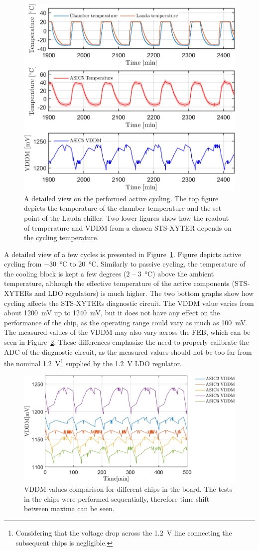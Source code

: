 \begin{figure}[!h]
\centering
\includegraphics[width=0.65\columnwidth]{Chapter4/images/FEB0ASIC5COMP.png}
\caption{A detailed view on the performed active cycling. The top figure depicts the temperature of the chamber temperature and the set point of the Lauda chiller. Two lower figures show how the readout of temperature and VDDM from a chosen STS-XYTER depends on the cycling temperature. }
\label{fig_active_detailed}
\end{figure}
A detailed view of a few cycles is presented in Figure~\ref{fig_active_detailed}. Figure depicts active cycling from \SI{-30}{\celsius} to \SI{20}{\celsius}. Similarly to passive cycling, the temperature of the cooling block is kept a few degrees ($2$ -- \SI{3}{\celsius}) above the ambient temperature, although the effective temperature of the active components (STS-XYTERs and \gls{LDO} regulators) is much higher. The two bottom graphs show how cycling affects the STS-XYTERs diagnostic circuit. The VDDM value varies from about \SI{1200}{\milli\volt} up to \SI{1240}{\milli\volt}, but it does not have any effect on the performance of the chip, as the operating range could vary as much as \SI{100}{\milli\volt}. The measured values of the VDDM may also vary across the \gls{FEB}, which can be seen in Figure~\ref{feb_vary}. These differences emphasize the need to properly calibrate the ADC of the diagnostic circuit, as the measured values should not be too far from the nominal \SI{1.2}{\volt}\footnote{Considering that the voltage drop across the \SI{1.2}{\volt} line connecting the subsequent chips is negligible.} supplied by the \SI{1.2}{\volt} \gls{LDO} regulator. 
\begin{figure}[!h]
\centering
\includegraphics[width=0.75\columnwidth]{Chapter4/images/vddm_comp.png}
\caption{VDDM values comparison for different chips in the board. The tests in the chips were performed sequentially, therefore time shift between maxima can be seen.}
\label{feb_vary}
\end{figure}

